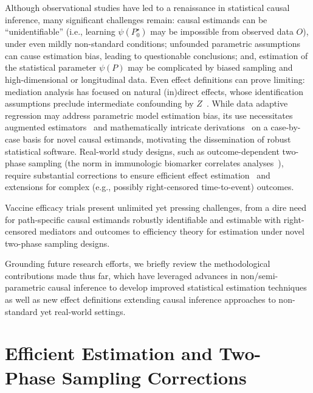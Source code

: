 Although observational studies have led to a renaissance in statistical causal
inference, many significant challenges remain: causal estimands can be
``unidentifiable'' (i.e., learning $\psi(P_0^{\star})$ may be impossible from
observed data $O$), under even mildly non-standard conditions; unfounded
parametric assumptions can cause estimation bias, leading to questionable
conclusions; and, estimation of the statistical parameter $\psi(P)$ may be
complicated by biased sampling and high-dimensional or longitudinal data. Even
effect definitions can prove limiting: mediation analysis has focused on natural
(in)direct effects, whose identification assumptions preclude intermediate
confounding by $Z$~\citep{petersen2006estimation, tchetgen2014identification,
miles2017partial, vanderweele2017mediation}. While data adaptive regression may
address parametric model estimation bias, its use necessitates augmented
estimators~\citep{pfanzagl1985contributions, vdl2011targeted, vdl2018targeted,
coyle2020targeted} and mathematically intricate
derivations~\citep{carone2018higher} on a case-by-case basis for novel causal
estimands, motivating the dissemination of robust statistical software.
Real-world study designs, such as outcome-dependent two-phase sampling (the norm
in immunologic biomarker correlates analyses~\citep{haynes2012immune}), require
substantial corrections to ensure efficient effect
estimation~\citep{hejazi2020efficient} and extensions for complex (e.g.,
possibly right-censored time-to-event) outcomes.

Vaccine efficacy trials present unlimited yet pressing challenges, from a dire
need for path-specific causal estimands robustly identifiable and estimable with
right-censored mediators and outcomes to efficiency theory for estimation under
novel two-phase sampling designs.

Grounding future research efforts, we briefly review the methodological
contributions made thus far, which have leveraged advances in
non/semi-parametric causal inference to develop improved statistical estimation
techniques as well as new effect definitions extending causal inference
approaches to non-standard yet real-world settings.

\section{Efficient Estimation and Two-Phase Sampling Corrections}

